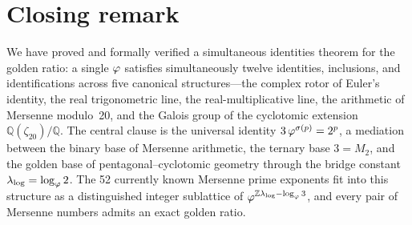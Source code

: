 \section{Closing remark}

We have proved and formally verified a simultaneous identities
theorem for the golden ratio: a single $\varphi$ satisfies
simultaneously twelve identities, inclusions, and identifications
across five canonical structures---the complex rotor of Euler's
identity, the real trigonometric line, the real-multiplicative line,
the arithmetic of Mersenne modulo~20, and the Galois group of the
cyclotomic extension $\mathbb{Q}(\zeta_{20})/\mathbb{Q}$.  The central
clause is the universal identity $3\,\varphi^{\sigma(p)}=2^{p}$, a
mediation between the binary base of Mersenne arithmetic, the ternary
base $3=M_{2}$, and the golden base of pentagonal--cyclotomic
geometry through the bridge constant $\lambda_{\log}=\log_{\varphi}2$.
The 52 currently known Mersenne prime exponents fit into this
structure as a distinguished integer sublattice of
$\varphi^{\mathbb{Z}\lambda_{\log}-\log_{\varphi} 3}$, and every pair
of Mersenne numbers admits an exact golden ratio.

